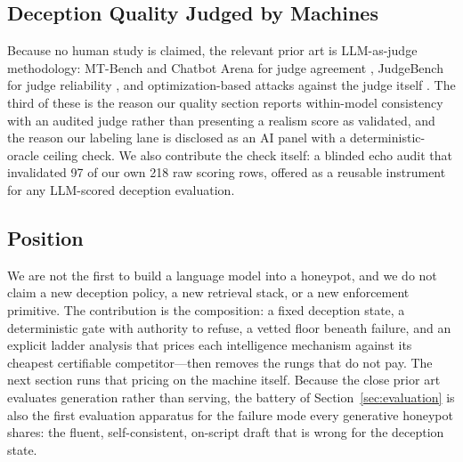 \subsection{Deception Quality Judged by Machines}

Because no human study is claimed, the relevant prior art is LLM-as-judge
methodology: MT-Bench and Chatbot Arena for judge agreement
\cite{zheng2024}, JudgeBench for judge reliability \cite{tan2025judgebench},
and optimization-based attacks against the judge itself
\cite{shi2024judgedeceiver}. The third of these is the reason our quality
section reports within-model consistency with an audited judge rather than
presenting a realism score as validated, and the reason our labeling lane
is disclosed as an AI panel with a deterministic-oracle ceiling
check. We also contribute the check itself: a blinded echo audit that
invalidated 97 of our own 218 raw scoring rows, offered as a reusable
instrument for any LLM-scored deception evaluation.

\subsection{Position}

We are not the first to build a language model into a honeypot, and we do
not claim a new deception policy, a new retrieval stack, or a new
enforcement primitive. The contribution is the composition: a fixed
deception state, a deterministic gate with authority to refuse, a vetted
floor beneath failure, and an explicit ladder analysis that prices each
intelligence mechanism against its cheapest certifiable competitor---then
removes the rungs that do not pay. The next section runs that pricing on
the machine itself. Because the close prior art evaluates
generation rather than serving, the battery of Section~\ref{sec:evaluation}
is also the first evaluation apparatus for the failure mode every
generative honeypot shares: the fluent, self-consistent, on-script draft
that is wrong for the deception state.